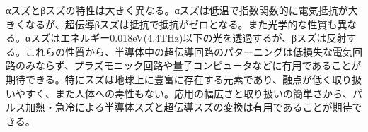 αスズとβスズの特性は大きく異なる。αスズは低温で指数関数的に電気抵抗が大きくなるが、超伝導βスズは抵抗で抵抗がゼロとなる。また光学的な性質も異なる。αスズはエネルギー0.018eV(4.4THz)以下の光を透過するが、βスズは反射する。これらの性質から、半導体中の超伝導回路のパターニングは低損失な電気回路のみならず、プラズモニック回路や量子コンピュータなどに有用であることが期待できる。特にスズは地球上に豊富に存在する元素であり、融点が低く取り扱いやすく、また人体への毒性もない。応用の幅広さと取り扱いの簡単さから、パルス加熱・急冷による半導体スズと超伝導スズの変換は有用であることが期待できる。
\clearpage
